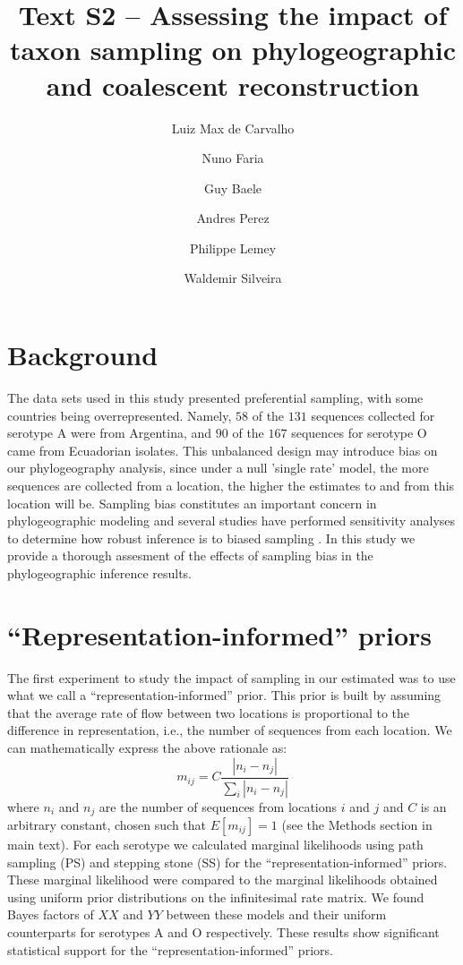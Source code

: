 \documentclass[a4paper,10pt]{article}
\title{Text S2 -- Assessing the impact of taxon sampling on phylogeographic and coalescent reconstruction} %
\author{
Luiz Max de Carvalho \\
\and Nuno Faria \\
\and Guy Baele\\
\and Andres Perez \\
\and Philippe Lemey \\
\and Waldemir Silveira 
}
\date{}
\begin{document}
\maketitle

\section{Background}
The data sets used in this study presented preferential sampling, with some countries being overrepresented.
Namely, $58$ of the $131$ sequences collected for serotype A were from Argentina, and $90$ of the $167$ sequences for serotype O came from Ecuadorian isolates.
This unbalanced design may introduce bias on our phylogeography analysis, since under a null 'single rate' model, the more sequences are collected from a location, the higher the estimates to and from this location will be. %
Sampling bias constitutes an important concern in phylogeographic modeling and several studies have performed sensitivity analyses to determine how robust inference is to biased sampling \cite{Faria2012,Lemey2013,polar,fluPNAS} .
In this study we provide a thorough assesment of the effects of sampling bias in the phylogeographic inference results. 
\section{``Representation-informed'' priors}
The first experiment to study the impact of sampling in our estimated was to use what we call a ``representation-informed'' prior.
This prior is built by assuming that the average rate of flow between two locations is proportional to the difference in representation, i.e., the number of sequences from each location.
We can mathematically express the above rationale as:
\begin{equation}
 m_{ij}=C\frac{|n_i-n_j|}{\sum_i|n_i-n_j|}
\end{equation}
where $n_i$ and $n_j$ are the number of sequences from locations $i$ and $j$ and $C$ is an arbitrary constant, chosen such that $E[m_{ij}]=1$ (see the Methods section in main text).
For each serotype we calculated marginal likelihoods using path sampling (PS) and stepping stone (SS) for the ``representation-informed'' priors.
These marginal likelihood were compared to the marginal likelihoods obtained using uniform prior distributions on the infinitesimal rate matrix.
We found Bayes factors of $XX$ and $YY$ between these models and their uniform counterparts for serotypes A and O respectively. %
These results show significant statistical support for the ``representation-informed'' priors.
\end{document}
